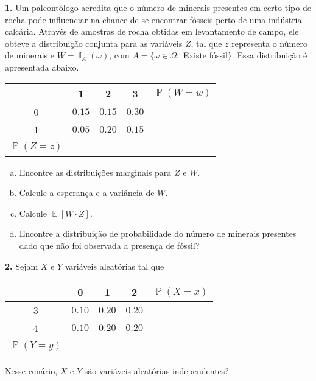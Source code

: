 \documentclass[12pt]{article}
\DeclareMathOperator{\PX}{\mathbb{P}} %
\DeclareMathOperator{\EX}{\mathbb{E}} %
\DeclareMathOperator{\IX}{\mathbb{I}} %
\begin{document}
\noindent\textbf{1.} Um paleontólogo acredita que o número de minerais presentes em certo tipo de rocha pode influenciar na chance de se encontrar fósseis perto de uma indústria calcária. Através de amostras de rocha obtidas em levantamento de campo, ele obteve a distribuição conjunta para as variáveis $Z$, tal que $z$ representa o número de minerais e $W = \IX_{A}(\omega)$, com $A = \{\omega \in \Omega : $ Existe fóssil$\}$. Essa distribuição é apresentada abaixo.

\begin{center}
	\begin{tabular}{c | c  c  c | c}
		\hline
		\diagbox[width = 60pt]{$w$}{$z$} & 1 & 2 & 3 & $\PX(W = w)$ \\
		\hline
		0 & $0.15$ & $0.15$ & $0.30$ & $~$ \\
		1 & $0.05$ & $0.20$ & $0.15$ & $~$ \\
		\hline
		$\PX(Z = z)$ & $~$ & $~$ & $~$ & ~ \\
		\hline
	\end{tabular}
\end{center}

\begin{enumerate}[(a)]
	\item Encontre as distribuições marginais para $Z$ e $W$.
	\item Calcule a esperança e a variância de $W$.
	\item Calcule $\EX[W \cdot Z]$.
	\item Encontre a distribuição de probabilidade do número de minerais presentes dado que não foi observada a presença de fóssil? 	  
\end{enumerate}

\newpage

\noindent\textbf{2.} Sejam $X$ e $Y$ variáveis aleatórias tal que

\begin{center}
	\begin{tabular}{c | c  c  c | c}
		\hline
		\diagbox[width = 60pt]{$x$}{$y$} & 0 & 1 & 2 & $\PX(X = x)$ \\
		\hline
		3 & $0.10$ & $0.20$ & $0.20$ & $~$ \\
		4 & $0.10$ & $0.20$ & $0.20$ & $~$ \\
		\hline
		$\PX(Y = y)$ & $~$ & $~$ & $~$ & ~ \\
		\hline
	\end{tabular}
\end{center}
Nesse cenário, $X$ e $Y$ são variáveis aleatórias independentes?
\end{document}
